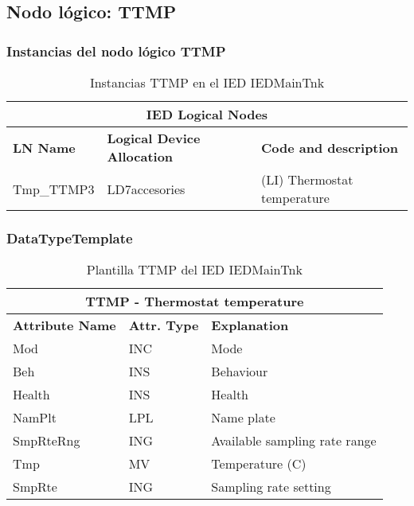 
\subsection{Nodo l\'ogico: 			 TTMP}

    \subsubsection{Instancias del nodo l\'ogico TTMP}
    \begin{table}[H]
    \begin{center}
    \begin{tabular}{|l|l|p{6.8cm}|}
            \hline
            \multicolumn{3}{|c|}{\cellcolor[gray]{0.8} \textbf{IED Logical Nodes} } \\
            \hline
            \textbf{LN Name} & \textbf{Logical Device Allocation} & \textbf{Code and description} \\
            \hline
            Tmp\_TTMP3 & LD7accesories & (LI) Thermostat temperature \\
            \hline
    \end{tabular}
    \caption{Instancias TTMP en el IED IEDMainTnk}
    \label{table:lnInstTTMP_thermostat}
    \end{center}
    \end{table}
    
    
    
    \subsubsection{DataTypeTemplate}
    \begin{table}[H]
    \begin{center}
    \begin{tabular}{|l|l|p{8.5cm}|}
            \hline
            \multicolumn{3}{|c|}{\cellcolor[gray]{0.8} \textbf{ TTMP}  - Thermostat temperature} \\
            \hline
            \textbf{Attribute Name} & \textbf{Attr. Type} & \textbf{Explanation} \\
            \hline 
            Mod & INC & Mode \\
            \hline
            Beh & INS & Behaviour \\
            \hline
            Health & INS & Health \\
            \hline
            NamPlt & LPL & Name plate \\
            \hline
            SmpRteRng & ING & Available sampling rate range \\
            \hline
            Tmp & MV & Temperature (C) \\
            \hline
            SmpRte & ING & Sampling rate setting \\
            \hline
    \end{tabular}
    \caption{Plantilla TTMP del IED IEDMainTnk}
    \label{table:lnTypeTTMP_thermostat}
    \end{center}
    \end{table}
    
    
    